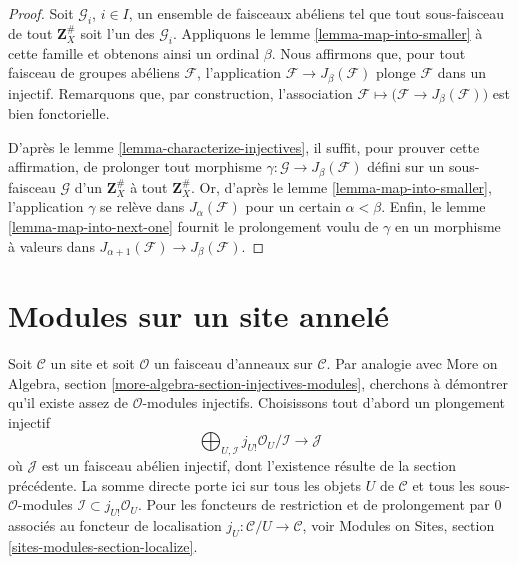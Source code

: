 \begin{proof}
Soit $\mathcal{G}_i$, $i \in I$, un ensemble de faisceaux abéliens tel que
tout sous-faisceau de tout $\mathbf{Z}_X^\#$ soit l'un des $\mathcal{G}_i$.
Appliquons le lemme \ref{lemma-map-into-smaller} à cette famille et obtenons
ainsi un ordinal $\beta$. Nous affirmons que, pour tout faisceau de groupes
abéliens $\mathcal{F}$, l'application
$\mathcal{F} \to J_\beta(\mathcal{F})$ plonge $\mathcal{F}$ dans un injectif.
Remarquons que, par construction, l'association
$\mathcal{F} \mapsto \big(\mathcal{F} \to J_\beta(\mathcal{F})\big)$ est bien
fonctorielle.

\medskip\noindent
D'après le lemme \ref{lemma-characterize-injectives}, il suffit, pour prouver
cette affirmation, de prolonger tout morphisme
$\gamma : \mathcal{G} \to J_\beta(\mathcal{F})$ défini sur un sous-faisceau
$\mathcal{G}$ d'un $\mathbf{Z}_X^\#$ à tout $\mathbf{Z}_X^\#$. Or, d'après le
lemme \ref{lemma-map-into-smaller}, l'application $\gamma$ se relève dans
$J_\alpha(\mathcal{F})$ pour un certain $\alpha < \beta$. Enfin, le
lemme \ref{lemma-map-into-next-one} fournit le prolongement voulu de $\gamma$
en un morphisme à valeurs dans
$J_{\alpha + 1}(\mathcal{F}) \to J_\beta(\mathcal{F})$.
\end{proof}






\section{Modules sur un site annelé}
\label{section-sheaves-modules}

\noindent
Soit $\mathcal{C}$ un site et soit $\mathcal{O}$ un faisceau d'anneaux sur
$\mathcal{C}$. Par analogie avec
More on Algebra, section \ref{more-algebra-section-injectives-modules},
cherchons à démontrer qu'il existe assez de $\mathcal{O}$-modules injectifs.
Choisissons tout d'abord un plongement injectif
$$
\bigoplus\nolimits_{U, \mathcal{I}}
j_{U!}\mathcal{O}_U/\mathcal{I}
\longrightarrow
\mathcal{J}
$$
où $\mathcal{J}$ est un faisceau abélien injectif, dont l'existence résulte de
la section précédente. La somme directe porte ici sur tous les objets $U$ de
$\mathcal{C}$ et tous les sous-$\mathcal{O}$-modules
$\mathcal{I} \subset j_{U!}\mathcal{O}_U$. Pour les foncteurs de restriction
et de prolongement par $0$ associés au foncteur de localisation
$j_U : \mathcal{C}/U \to \mathcal{C}$, voir
Modules on Sites, section \ref{sites-modules-section-localize}.

